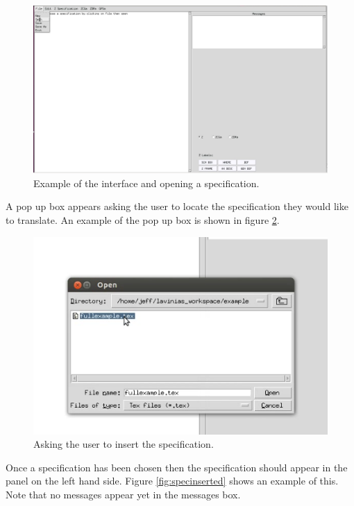 \begin{figure}[H]
\includegraphics[scale=0.4]{Figures/Interface/openspec.png}
\caption{Example of the interface and opening a specification. \label{fig:openspec}}
\end{figure}

A pop up box appears asking the user to locate the specification they would like
to translate. An example of the pop up box is shown in figure
\ref{fig:choosespec}. 

\begin{figure}[H]
\includegraphics[scale=0.6]{Figures/Interface/choosespec.png}
\caption{Asking the user to insert the specification. \label{fig:choosespec}}
\end{figure}

Once a specification has been chosen then the specification should appear in the
panel on the left hand side. Figure \ref{fig:specinserted} shows an example of
this. Note that no messages appear yet in the messages box.

